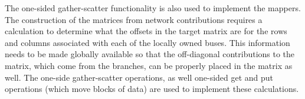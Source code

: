 \documentclass[preprint]{acm_proc_article-sp}
\begin{document}
The one-sided gather-scatter functionality is also used 
to implement the mappers. The construction of the matrices from network
contributions requires a calculation to determine what the offsets in the
target matrix are for the rows and columns associated with each of the locally
owned buses. This information needs to be made globally available so that the
off-diagonal contributions to the matrix, which come from the branches, can be
properly placed in the matrix as well. The one-side gather-scatter operations,
as well one-sided get and put operations (which move blocks of data) are used to
implement these calculations.

\end{document}
